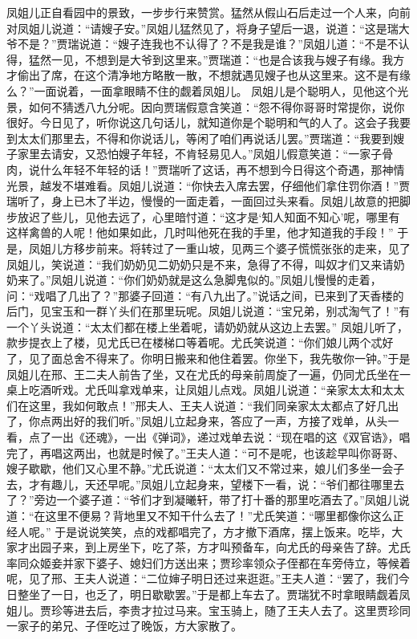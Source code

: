 \documentclass[12pt,oneside]{book}
\begin{document}
凤姐儿正自看园中的景致，一步步行来赞赏。猛然从假山石后走过一个人来，向前对凤姐儿说道：“请嫂子安。”凤姐儿猛然见了，将身子望后一退，说道：“这是瑞大爷不是？”贾瑞说道：“嫂子连我也不认得了？不是我是谁？”凤姐儿道：“不是不认得，猛然一见，不想到是大爷到这里来。”贾瑞道：“也是合该我与嫂子有缘。我方才偷出了席，在这个清净地方略散一散，不想就遇见嫂子也从这里来。这不是有缘么？”一面说着，一面拿眼睛不住的觑着凤姐儿。
凤姐儿是个聪明人，见他这个光景，如何不猜透八九分呢。因向贾瑞假意含笑道：“怨不得你哥哥时常提你，说你很好。今日见了，听你说这几句话儿，就知道你是个聪明和气的人了。这会子我要到太太们那里去，不得和你说话儿，等闲了咱们再说话儿罢。”贾瑞道：“我要到嫂子家里去请安，又恐怕嫂子年轻，不肯轻易见人。”凤姐儿假意笑道：“一家子骨肉，说什么年轻不年轻的话！”贾瑞听了这话，再不想到今日得这个奇遇，那神情光景，越发不堪难看。凤姐儿说道：“你快去入席去罢，仔细他们拿住罚你酒！”贾瑞听了，身上已木了半边，慢慢的一面走着，一面回过头来看。凤姐儿故意的把脚步放迟了些儿，见他去远了，心里暗忖道：“这才是‘知人知面不知心’呢，哪里有这样禽兽的人呢！他如果如此，几时叫他死在我的手里，他才知道我的手段！”
于是，凤姐儿方移步前来。将转过了一重山坡，见两三个婆子慌慌张张的走来，见了凤姐儿，笑说道：“我们奶奶见二奶奶只是不来，急得了不得，叫奴才们又来请奶奶来了。”凤姐儿说道：“你们奶奶就是这么急脚鬼似的。”凤姐儿慢慢的走着，问：“戏唱了几出了？”那婆子回道：“有八九出了。”说话之间，已来到了天香楼的后门，见宝玉和一群丫头们在那里玩呢。凤姐儿说道：“宝兄弟，别忒淘气了！”有一个丫头说道：“太太们都在楼上坐着呢，请奶奶就从这边上去罢。”
凤姐儿听了，款步提衣上了楼，见尤氏已在楼梯口等着呢。尤氏笑说道：“你们娘儿两个忒好了，见了面总舍不得来了。你明日搬来和他住着罢。你坐下，我先敬你一钟。”于是凤姐儿在邢、王二夫人前告了坐，又在尤氏的母亲前周旋了一遍，仍同尤氏坐在一桌上吃酒听戏。尤氏叫拿戏单来，让凤姐儿点戏。凤姐儿说道：“亲家太太和太太们在这里，我如何敢点！”邢夫人、王夫人说道：“我们同亲家太太都点了好几出了，你点两出好的我们听。”凤姐儿立起身来，答应了一声，方接了戏单，从头一看，点了一出《还魂》，一出《弹词》，递过戏单去说：“现在唱的这《双官诰》，唱完了，再唱这两出，也就是时候了。”王夫人道：“可不是呢，也该趁早叫你哥哥、嫂子歇歇，他们又心里不静。”尤氏说道：“太太们又不常过来，娘儿们多坐一会子去，才有趣儿，天还早呢。”凤姐儿立起身来，望楼下一看，说：“爷们都往哪里去了？”旁边一个婆子道：“爷们才到凝曦轩，带了打十番的那里吃酒去了。”凤姐儿说道：“在这里不便易？背地里又不知干什么去了！”尤氏笑道：“哪里都像你这么正经人呢。”
于是说说笑笑，点的戏都唱完了，方才撤下酒席，摆上饭来。吃毕，大家才出园子来，到上房坐下，吃了茶，方才叫预备车，向尤氏的母亲告了辞。尤氏率同众姬妾并家下婆子、媳妇们方送出来；贾珍率领众子侄都在车旁侍立，等候着呢，见了邢、王夫人说道：“二位婶子明日还过来逛逛。”王夫人道：“罢了，我们今日整坐了一日，也乏了，明日歇歇罢。”于是都上车去了。贾瑞犹不时拿眼睛觑着凤姐儿。贾珍等进去后，李贵才拉过马来。宝玉骑上，随了王夫人去了。这里贾珍同一家子的弟兄、子侄吃过了晚饭，方大家散了。
\end{document}
